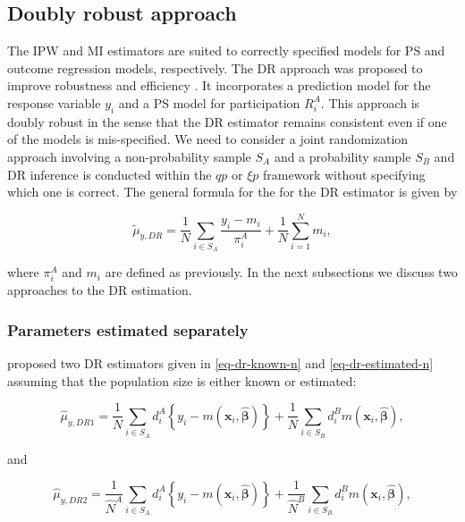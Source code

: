 \documentclass[
]{jss}
\begin{document}
\subsection{Doubly robust approach}\label{sec-dr-approach}

The IPW and MI estimators are suited to correctly specified models for
PS and outcome regression models, respectively. The DR approach was
proposed to improve robustness and efficiency
\citep[cf.][]{robins1994estimation}. It incorporates a prediction model
for the response variable \(y_i\) and a PS model for participation
\(R_i^A\). This approach is doubly robust in the sense that the DR
estimator remains consistent even if one of the models is mis-specified.
We need to consider a joint randomization approach involving a
non-probability sample \(S_A\) and a probability sample \(S_B\) and DR
inference is conducted within the \(qp\) or \(\xi p\) framework without
specifying which one is correct. The general formula for the for the DR
estimator is given by

\[
\tilde{\mu}_{y,DR} = \frac{1}{N}\sum_{i \in S_A}\frac{y_i - m_i}{\pi_i^A} + \frac{1}{N}\sum_{i =1}^N m_i,
\]

where \(\pi_i^A\) and \(m_i\) are defined as previously. In the next
subsections we discuss two approaches to the DR estimation.

\subsubsection{Parameters estimated
separately}\label{parameters-estimated-separately}

\citet{chen2020doubly} proposed two DR estimators given in
\eqref{eq-dr-known-n} and \eqref{eq-dr-estimated-n} assuming that the
population size is either known or estimated:

\begin{equation}
\hat{\mu}_{y,DR1}=\frac{1}{N} \sum_{i \in S_{A}} d_i^{A}\left\{y_i-m\left(\boldsymbol{x}_i, \hat{\boldsymbol{\beta}}\right)\right\}+\frac{1}{N} \sum_{i \in S_{B}} d_i^{B} m\left(\boldsymbol{x}_i, \hat{\boldsymbol{\beta}}\right),
\label{eq-dr-known-n}
\end{equation}

and

\begin{equation}
\hat{\mu}_{y,DR2}=\frac{1}{\hat{N}^{A}} \sum_{i \in S_{A}} d_i^{A}\left\{y_i-m\left(\boldsymbol{x}_i, \hat{\boldsymbol{\beta}}\right)\right\}+\frac{1}{\hat{N}^{B}} \sum_{i \in S_{B}} d_i^{B} m\left(\boldsymbol{x}_i, \hat{\boldsymbol{\beta}}\right),
\label{eq-dr-estimated-n}
\end{equation}
\end{document}
